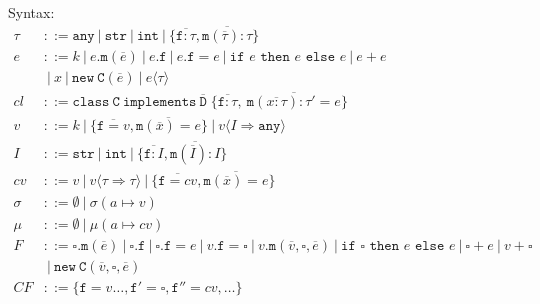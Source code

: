 \documentclass{report}
\begin{document}
\newcommand{\class}{\ensuremath{\xt{class}}\xspace}
\newcommand{\G}{\Gamma}
\renewcommand{\int}{\texttt{int}}
\newcommand{\coerce}{\Rightarrow} %
\newcommand{\str}{\texttt{str}}
\newcommand{\any}{\texttt{any}}   %
\newcommand{\this}{\texttt{this}}
\newcommand{\ifthenelse}[3]{\texttt{if }#1\texttt{ then }#2\texttt{ else }#3}
\newcommand{\cast}[1]{\langle #1\rangle} 
\newcommand{\xt}[1]{\texttt{#1}}
\newcommand{\creduce}{\longrightarrow_{cr}}  %
\newcommand{\ereduce}{\longrightarrow_{e}}   %
\newcommand{\stepsto}{\longrightarrow}        %
\newcommand{\intv}[1]{\xt{int}[#1]}
\newcommand{\strv}[1]{\xt{str}[#1]}
\newcommand{\tlate}{\rightsquigarrow}
\newcommand{\s}{\sigma}
\renewcommand{\sc}{\mu}
\renewcommand{\t}{\tau}
\newcommand{\B}{\ensuremath{~|~}\xspace}
\newcommand{\new}{\ensuremath{\texttt{new}}\xspace}
\newcommand{\NEW}[2]{\ensuremath{  \new ~ #1 ( #2 )}\xspace}
\renewcommand{\bar}[1]{\ensuremath{\overline{ #1} }\xspace}
\newcommand{\m}{\ensuremath{\xt{m}}\xspace}
\newcommand{\f}{\ensuremath{\xt{f}}\xspace}
\newcommand{\C}{\ensuremath{\xt{C}}\xspace}
\newcommand{\D}{\ensuremath{\xt{D}}\xspace}
\newcommand{\is}{\mapsto}
\newcommand{\cl}{\mathit{cl}\xspace}
\newcommand{\implements}{\xt{implements}\xspace}
\newcommand{\CLASS}[3]{ \ensuremath{  \xt{class}~#1~\implements~#2\;\{ #3 \}}\xspace} 
\newcommand{\MDEF}[4] { #1( #2 ):#3 = #4}
\newcommand{\MTYPE}[3] { #1( #2 ):#3}
\newcommand{\MVAL}[3] { #1( #2 ) = #3}
\newcommand{\Gdash}{\G\vdash}

Syntax:
\begin{align*}
\t &::= \any \B  \str \B  \int \B  \{\bar{\f :\t},\bar{\m (\bar{\t}):\t}\}\\
e &::= k \B  e.\m(\bar{e}) \B e.\f  \B e.\f  = e \B  \ifthenelse{e}{e}{e}\B e + e \\
&\B x\B \NEW \C {\bar{e}} \B  e\cast{\t}\\
\cl &::= \CLASS \C {\bar \D} { \bar{ \f : \t }, ~ \bar{ \MDEF{\m}{\bar{x :\t}}{\t'}{e} } } \\
v &::= k \B  \{\bar{\f=v},\bar{\m (\bar x)=e}\} \B  v\cast{I \coerce \any}\\
I &::= \str \B  \int \B  \{\bar{\f :I},\bar{\m (\bar{I}):I}\}\\
cv &::= v \B  v\cast{\t \coerce \t} \B  \{\bar{\f=cv},\bar{ \MVAL\m{\bar x}e }\}\\
\s &::= \emptyset \B  \s( a \is v )\\
\sc &::= \emptyset \B  \sc( a \is cv )\\
F &::=    \square.\m(\bar e) 
   \B 	  \square.\f 
   \B 	  \square.\f  = e
   \B     v.\f  = \square
   \B     v.\m(\bar v,\square, \bar e) 
   \B     \ifthenelse{\square}{e}{e} 
   \B     \square + e 
   \B      v + \square\\
&\B \NEW  \C {\bar{v},\square,\bar{e}}\\
\mathit{CF} &::= \{\f=v\ldots,\f'=\square,\f''=cv,\ldots\}\\
\end{align*}
\end{document}
